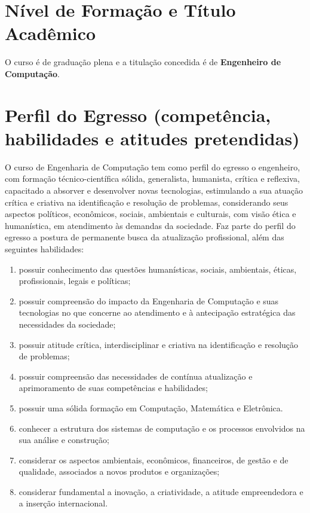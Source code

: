\section{Nível de Formação e Título Acadêmico}

O curso é de graduação plena e a titulação concedida é de \textbf{Engenheiro de Computação}.

\section{Perfil do Egresso (competência, habilidades e atitudes pretendidas)}

O curso de Engenharia de Computação tem como perfil do egresso o engenheiro, com formação técnico-científica sólida, generalista, humanista, crítica e reflexiva, capacitado a absorver e desenvolver novas tecnologias, estimulando a sua atuação crítica e criativa na identificação e resolução de problemas, considerando seus aspectos políticos, econômicos, sociais, ambientais e culturais, com visão ética e humanística, em atendimento às demandas da sociedade. Faz parte do perfil do egresso a postura de permanente busca da atualização profissional, além das seguintes habilidades:
\begin{enumerate} [I -]
    \item possuir conhecimento das questões humanísticas, sociais, ambientais, éticas, profissionais, legais e políticas;
    \item possuir compreensão do impacto da Engenharia de Computação e suas tecnologias no que concerne ao atendimento e à antecipação estratégica das necessidades da sociedade;
    \item possuir atitude crítica, interdisciplinar e criativa na identificação e resolução de problemas;
    \item possuir compreensão das necessidades de contínua atualização e aprimoramento de suas competências e habilidades;
    \item possuir uma sólida formação em Computação, Matemática e Eletrônica.
    \item conhecer a estrutura dos sistemas de computação e os processos envolvidos na sua análise e construção;
    \item considerar os aspectos ambientais, econômicos, financeiros, de gestão e de qualidade, associados a novos produtos e organizações;
    \item considerar fundamental a inovação, a criatividade, a atitude empreendedora e a inserção internacional.
\end{enumerate}


